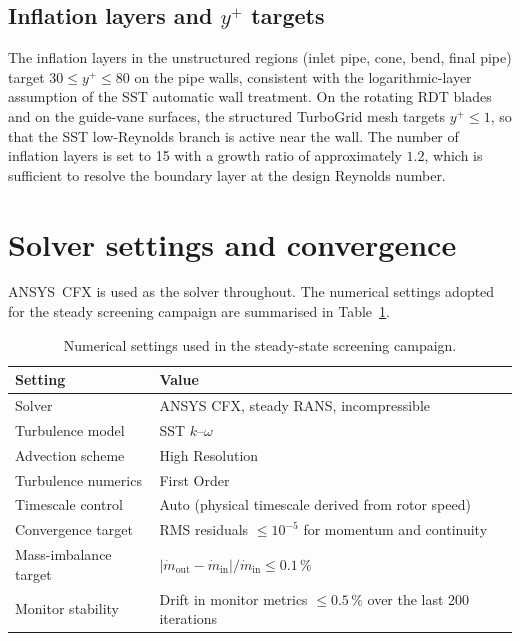 \subsection{Inflation layers and $y^+$ targets}
\label{sec:methods_inflation}
 
The inflation layers in the unstructured regions (inlet pipe, cone, bend, final pipe) target $30 \leq y^+ \leq 80$ on the pipe walls, consistent with the logarithmic-layer assumption of the SST automatic wall treatment. On the rotating RDT blades and on the guide-vane surfaces, the structured TurboGrid mesh targets $y^+ \leq 1$, so that the SST low-Reynolds branch is active near the wall. The number of inflation layers is set to 15 with a growth ratio of approximately $1.2$, which is sufficient to resolve the boundary layer at the design Reynolds number.
 
\section{Solver settings and convergence}
\label{sec:methods_solver}
 
ANSYS~CFX is used as the solver throughout. The numerical settings adopted for the steady screening campaign are summarised in Table~\ref{tab:cfx_settings_master}.
 
\begin{table}[h!]
  \centering
  \caption[Solver settings, screening campaign]{Numerical settings used in the steady-state screening campaign.}
  \label{tab:cfx_settings_master}
  \small
  \begin{tabular}{l l}
    \toprule
    \textbf{Setting} & \textbf{Value} \\
    \midrule
    Solver                       & ANSYS CFX, steady RANS, incompressible \\
    Turbulence model             & SST $k$--$\omega$ \\
    Advection scheme             & High Resolution \\
    Turbulence numerics          & First Order\\
    Timescale control            & Auto (physical timescale derived from rotor speed) \\
    Convergence target           & RMS residuals $\leq 10^{-5}$ for momentum and continuity \\
    Mass-imbalance target        & $|\dot m_{\mathrm{out}} - \dot m_{\mathrm{in}}|/\dot m_{\mathrm{in}} \leq 0.1\,\%$ \\
    Monitor stability            & Drift in monitor metrics $\leq 0.5\,\%$ over the last 200 iterations \\
    \bottomrule
  \end{tabular}
\end{table}
 
